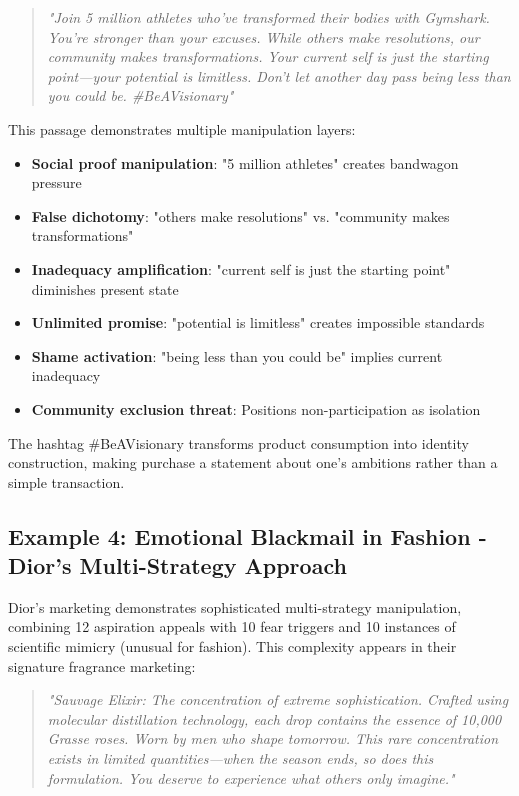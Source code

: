 \begin{quote}
\textit{"Join 5 million athletes who've transformed their bodies with Gymshark. You're stronger than your excuses. While others make resolutions, our community makes transformations. Your current self is just the starting point—your potential is limitless. Don't let another day pass being less than you could be. #BeAVisionary"}
\end{quote}

This passage demonstrates multiple manipulation layers:
\begin{itemize}
\item \textbf{Social proof manipulation}: "5 million athletes" creates bandwagon pressure
\item \textbf{False dichotomy}: "others make resolutions" vs. "community makes transformations"
\item \textbf{Inadequacy amplification}: "current self is just the starting point" diminishes present state
\item \textbf{Unlimited promise}: "potential is limitless" creates impossible standards
\item \textbf{Shame activation}: "being less than you could be" implies current inadequacy
\item \textbf{Community exclusion threat}: Positions non-participation as isolation
\end{itemize}

The hashtag #BeAVisionary transforms product consumption into identity construction, making purchase a statement about one's ambitions rather than a simple transaction.

\subsection{Example 4: Emotional Blackmail in Fashion - Dior's Multi-Strategy Approach}

Dior's marketing demonstrates sophisticated multi-strategy manipulation, combining 12 aspiration appeals with 10 fear triggers and 10 instances of scientific mimicry (unusual for fashion). This complexity appears in their signature fragrance marketing:

\begin{quote}
\textit{"Sauvage Elixir: The concentration of extreme sophistication. Crafted using molecular distillation technology, each drop contains the essence of 10,000 Grasse roses. Worn by men who shape tomorrow. This rare concentration exists in limited quantities—when the season ends, so does this formulation. You deserve to experience what others only imagine."}
\end{quote}

